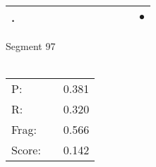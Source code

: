 \documentclass[landscape]{article}
\newcommand{\ssp}{\hspace{2pt}}
\newcommand{\mex}{\cellcolor{g}$\bullet$}
\begin{document}
\begin{tabular}{|l|p{10pt}|p{10pt}|p{10pt}|p{10pt}|p{10pt}|p{10pt}|p{10pt}|p{10pt}|p{10pt}|p{10pt}|p{10pt}|}
\hline
\ssp \cellcolor{ref10}. \ssp&\hspace{2pt}&\hspace{2pt}&\hspace{2pt}&\hspace{2pt}&\hspace{2pt}&\hspace{2pt}&\hspace{2pt}&\hspace{2pt}&\hspace{2pt}&\hspace{2pt}&\hspace{2pt}\mex\\
\hline
\end{tabular}

\vspace{6pt}
\noindent Segment 97\\\\
\noindent\begin{tabular}{lm{12pt}r}
\hline
P:&&0.381\\
R:&&0.320\\
Frag:&&0.566\\
Score:&&0.142\\
\end{tabular}

\newpage
\end{document}
